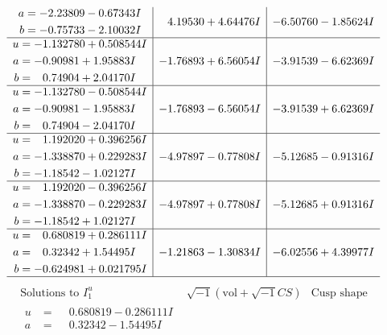 \documentclass[1p]{elsarticle_modified}
\theoremstyle{definition}
\newcommand{\I}{\sqrt{-1}}
\begin{document}
$$\begin{array}{c|c|c}
\begin{aligned}
a &= -2.23809 - 0.67343 I \\
b &= -0.75733 - 2.10032 I\end{aligned}
 & \phantom{-}4.19530 + 4.64476 I & -6.50760 - 1.85624 I \\ \hline\begin{aligned}
u &= -1.132780 + 0.508544 I \\
a &= -0.90981 + 1.95883 I \\
b &= \phantom{-}0.74904 + 2.04170 I\end{aligned}
 & -1.76893 + 6.56054 I & -3.91539 - 6.62369 I \\ \hline\begin{aligned}
u &= -1.132780 - 0.508544 I \\
a &= -0.90981 - 1.95883 I \\
b &= \phantom{-}0.74904 - 2.04170 I\end{aligned}
 & -1.76893 - 6.56054 I & -3.91539 + 6.62369 I \\ \hline\begin{aligned}
u &= \phantom{-}1.192020 + 0.396256 I \\
a &= -1.338870 + 0.229283 I \\
b &= -1.18542 - 1.02127 I\end{aligned}
 & -4.97897 - 0.77808 I & -5.12685 - 0.91316 I \\ \hline\begin{aligned}
u &= \phantom{-}1.192020 - 0.396256 I \\
a &= -1.338870 - 0.229283 I \\
b &= -1.18542 + 1.02127 I\end{aligned}
 & -4.97897 + 0.77808 I & -5.12685 + 0.91316 I \\ \hline\begin{aligned}
u &= \phantom{-}0.680819 + 0.286111 I \\
a &= \phantom{-}0.32342 + 1.54495 I \\
b &= -0.624981 + 0.021795 I\end{aligned}
 & -1.21863 - 1.30834 I & -6.02556 + 4.39977 I\\
 \hline 
 \end{array}$$\newpage$$\begin{array}{c|c|c}  
\text{Solutions to }I^u_{1}& \I (\text{vol} + \sqrt{-1}CS) & \text{Cusp shape}\\
 \hline 
\begin{aligned}
u &= \phantom{-}0.680819 - 0.286111 I \\
a &= \phantom{-}0.32342 - 1.54495 I \\

\end{aligned}
\end{array}$$
\end{document}
